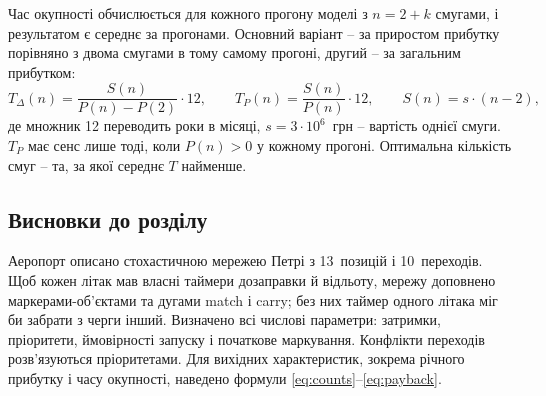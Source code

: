 Час окупності обчислюється для кожного прогону моделі з $n = 2 + k$ смугами, і результатом є середнє за прогонами. Основний варіант -- за приростом прибутку порівняно з двома смугами в тому самому прогоні, другий -- за загальним прибутком:
\begin{equation}
T_{\Delta}(n) = \frac{S(n)}{P(n) - P(2)} \cdot 12, \qquad T_{P}(n) = \frac{S(n)}{P(n)} \cdot 12, \qquad S(n) = s \cdot (n - 2),
\label{eq:payback}
\end{equation}
де множник 12 переводить роки в місяці, $s = 3 \cdot 10^6$~грн -- вартість однієї смуги. $T_{P}$ має сенс лише тоді, коли $P(n) > 0$ у кожному прогоні. Оптимальна кількість смуг -- та, за якої середнє $T$ найменше.

\subsection{Висновки до розділу}

Аеропорт описано стохастичною мережею Петрі з 13~позицій і 10~переходів. Щоб кожен літак мав власні таймери дозаправки й відльоту, мережу доповнено маркерами-об'єктами та дугами match і carry; без них таймер одного літака міг би забрати з черги інший. Визначено всі числові параметри: затримки, пріоритети, ймовірності запуску і початкове маркування. Конфлікти переходів розв'язуються пріоритетами. Для вихідних характеристик, зокрема річного прибутку і часу окупності, наведено формули \eqref{eq:counts}--\eqref{eq:payback}.
